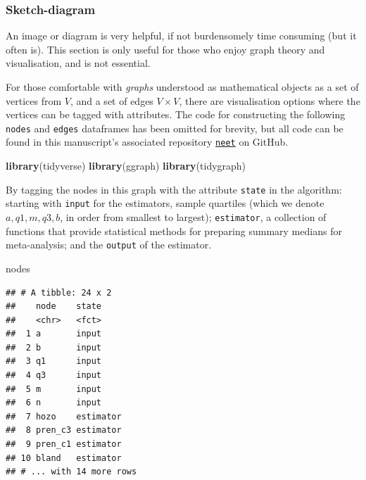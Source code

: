 \documentclass[
]{article}
\newenvironment{Shaded}{\begin{snugshade}}{\end{snugshade}}
\newcommand{\KeywordTok}[1]{\textcolor[rgb]{0.13,0.29,0.53}{\textbf{#1}}}
\newcommand{\NormalTok}[1]{#1}
\begin{document}
\hypertarget{sketch-diagram}{%
\subsubsection{Sketch-diagram}\label{sketch-diagram}}

An image or diagram is very helpful, if not burdensomely time consuming
(but it often is). This section is only useful for those who enjoy graph
theory and visualisation, and is not essential.

For those comfortable with \emph{graphs} understood as mathematical
objects as a set of vertices from \(V\), and a set of edges
\(V \times V\), there are visualisation options where the vertices can
be tagged with attributes. The code for constructing the following
\texttt{nodes} and \texttt{edges} dataframes has been omitted for
brevity, but all code can be found in this manuscript's associated
repository \href{https://github.com/softloud/neet}{\texttt{neet}} on
GitHub.

\begin{Shaded}
\begin{Highlighting}[]
\KeywordTok{library}\NormalTok{(tidyverse)}
\KeywordTok{library}\NormalTok{(ggraph)}
\KeywordTok{library}\NormalTok{(tidygraph)}
\end{Highlighting}
\end{Shaded}

By tagging the nodes in this graph with the attribute \texttt{state} in
the algorithm: starting with \texttt{input} for the estimators, sample
quartiles (which we denote \(a, q1, m, q3, b\), in order from smallest
to largest); \texttt{estimator}, a collection of functions that provide
statistical methods for preparing summary medians for meta-analysis; and
the \texttt{output} of the estimator.

\begin{Shaded}
\begin{Highlighting}[]
\NormalTok{nodes}
\end{Highlighting}
\end{Shaded}

\begin{verbatim}
## # A tibble: 24 x 2
##    node    state    
##    <chr>   <fct>    
##  1 a       input    
##  2 b       input    
##  3 q1      input    
##  4 q3      input    
##  5 m       input    
##  6 n       input    
##  7 hozo    estimator
##  8 pren_c3 estimator
##  9 pren_c1 estimator
## 10 bland   estimator
## # ... with 14 more rows
\end{verbatim}
\end{document}
